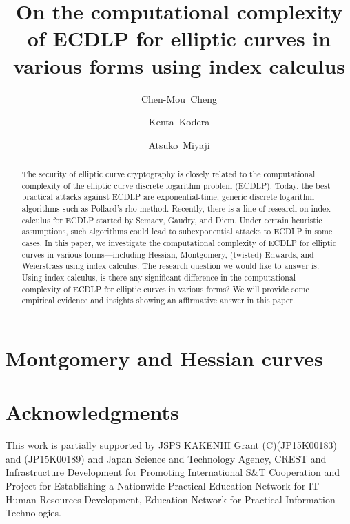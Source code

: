 \documentclass{llncs}
\begin{document}
%
\title{On the computational complexity of ECDLP for elliptic curves in
  various forms using index calculus}
%
%
\author{Chen-Mou~Cheng \and Kenta~Kodera \and Atsuko~Miyaji}
%
%

\maketitle              %

\begin{abstract}
%
  The security of elliptic curve cryptography is closely related to
  the computational complexity of the elliptic curve discrete
  logarithm problem (ECDLP).
%
  Today, the best practical attacks against ECDLP are
  exponential-time, generic discrete logarithm algorithms such as
  Pollard's rho method.
%
  Recently, there is a line of research on index calculus for ECDLP
  started by Semaev, Gaudry, and
  Diem.
%
  Under certain heuristic assumptions, such algorithms could lead to
  subexponential attacks to ECDLP in some
  cases.
%
  In this paper, we investigate the computational complexity of ECDLP
  for elliptic curves in various forms---including
  Hessian,
  Montgomery, (twisted)
  Edwards,
  and Weierstrass using index calculus.
%
  The research question we would like to answer is: Using index
  calculus, is there any significant difference in the computational
  complexity of ECDLP for elliptic curves in various forms?
%
  We will provide some empirical evidence and insights showing an
  affirmative answer in this paper.
%
\end{abstract}



\section{Montgomery and Hessian curves}
\label{sec:montgomery-hessian}






\section*{Acknowledgments}
%
This work is partially supported by JSPS KAKENHI Grant (C)(JP15K00183)
and (JP15K00189) and Japan Science and Technology Agency, CREST and
Infrastructure Development for Promoting International S\&T
Cooperation and Project for Establishing a Nationwide Practical
Education Network for IT Human Resources Development, Education
Network for Practical Information Technologies.
%

%
%


\end{document}
